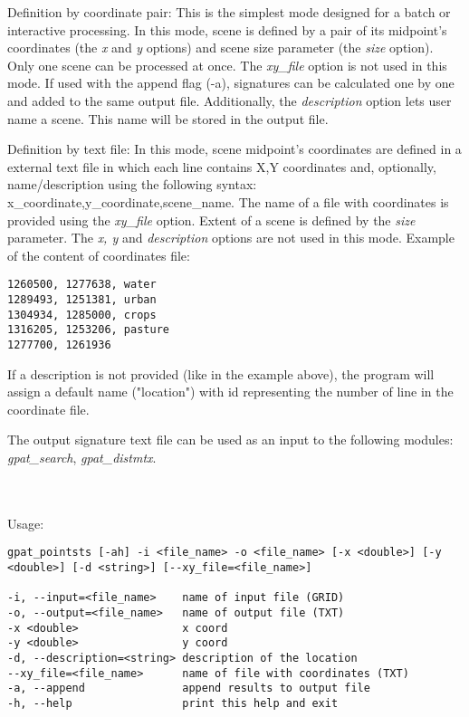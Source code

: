 Definition by coordinate pair: 
This is the simplest mode designed for a batch or interactive processing. 
In this mode, scene is defined by a pair of its midpoint's coordinates (the {\it x} and {\it y} options) and scene size parameter (the {\it size} option). 
Only one scene can be processed at once. 
The {\it xy\_file} option is not used in this mode.
If used with the append flag (-a), signatures can be calculated one by one and added to the same output file. 
Additionally, the {\it description} option lets user name a scene. 
This name will be stored in the output file.

Definition by text file:
In this mode, scene midpoint's coordinates are defined in a external text file in which each line contains X,Y coordinates and, optionally, name/description using the following syntax: x\_coordinate,y\_coordinate,scene\_name.
The name of a file with coordinates is provided using the {\it xy\_file} option. 
Extent of a scene is defined by the {\it size} parameter. 
The {\it x, y} and {\it description} options are not used in this mode. 
Example of the content of coordinates file: 

\begin{minipage}{\linewidth}
\begin{lstlisting}
1260500, 1277638, water
1289493, 1251381, urban
1304934, 1285000, crops
1316205, 1253206, pasture
1277700, 1261936
\end{lstlisting}
\end{minipage}

If a description is not provided (like in the example above), the program will assign a default name ("location") with id representing the number of line in the coordinate file.

The output signature text file can be used as an input to the following modules: {\it gpat\_search}, {\it gpat\_distmtx}.

{}
\\\\
Usage:

\begin{minipage}{\linewidth}
\begin{lstlisting}
gpat_pointsts [-ah] -i <file_name> -o <file_name> [-x <double>] [-y <double>] [-d <string>] [--xy_file=<file_name>]

-i, --input=<file_name>    name of input file (GRID)
-o, --output=<file_name>   name of output file (TXT)
-x <double>                x coord
-y <double>                y coord
-d, --description=<string> description of the location
--xy_file=<file_name>      name of file with coordinates (TXT)
-a, --append               append results to output file
-h, --help                 print this help and exit
\end{lstlisting}
\end{minipage}

